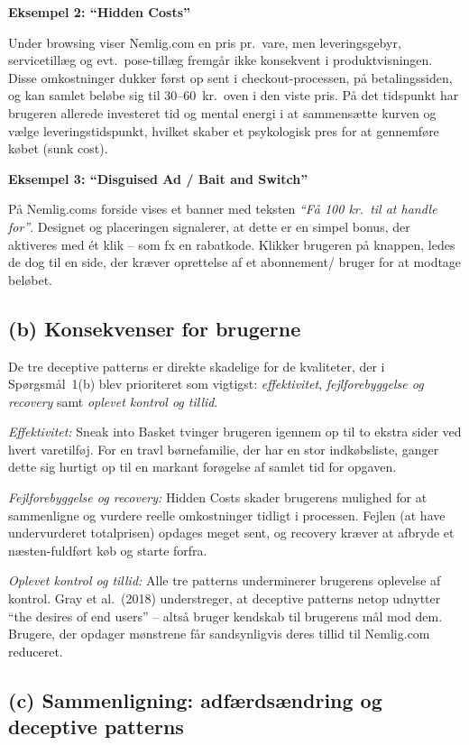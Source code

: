 \documentclass[12pt,a4paper]{article}
\begin{document}
\textbf{Eksempel 2: ``Hidden Costs''}

Under browsing viser Nemlig.com en pris pr.\ vare, men leveringsgebyr,
servicetillæg og evt.\ pose-tillæg fremgår ikke konsekvent i produktvisningen. Disse
omkostninger dukker først op sent i checkout-processen, på betalingssiden, og kan samlet
beløbe sig til 30--60~kr.\ oven i den viste pris. På det tidspunkt har brugeren allerede
investeret tid og mental energi i at sammensætte kurven og vælge leveringstidspunkt, hvilket
skaber et psykologisk pres for at gennemføre købet (sunk cost).


\textbf{Eksempel 3: ``Disguised Ad / Bait and Switch''}

På Nemlig.coms forside vises et banner med teksten \emph{``Få 100 kr.\ til at
handle for''}. Designet og placeringen signalerer, at dette er en simpel
bonus, der aktiveres med ét klik -- som fx en rabatkode. Klikker brugeren på knappen, ledes de dog til en side, der kræver oprettelse af et abonnement/ bruger  for at modtage beløbet.

\subsection*{(b) Konsekvenser for brugerne}

De tre deceptive patterns er direkte skadelige for de kvaliteter, der i Spørgsmål~1(b) blev
prioriteret som vigtigst: \emph{effektivitet}, \emph{fejlforebyggelse og recovery} samt
\emph{oplevet kontrol og tillid}.

\textit{Effektivitet:} Sneak into Basket tvinger brugeren igennem op til to ekstra sider ved
hvert varetilføj. For en travl børnefamilie, der har en stor indkøbsliste, ganger dette sig
hurtigt op til en markant forøgelse af samlet tid for opgaven.

\textit{Fejlforebyggelse og recovery:} Hidden Costs skader brugerens mulighed for at sammenligne
og vurdere reelle omkostninger tidligt i processen. Fejlen (at have undervurderet totalprisen)
opdages meget sent, og recovery kræver at afbryde et næsten-fuldført køb og starte forfra.

\textit{Oplevet kontrol og tillid:} Alle tre patterns underminerer brugerens oplevelse af
kontrol. Gray et al.\ (2018) understreger, at deceptive patterns netop udnytter ``the desires
of end users'' -- altså bruger kendskab til brugerens mål mod dem. Brugere, der opdager mønstrene får sandsynligvis deres tillid til Nemlig.com reduceret. 

\subsection*{(c) Sammenligning: adfærdsændring og deceptive patterns}
\end{document}
